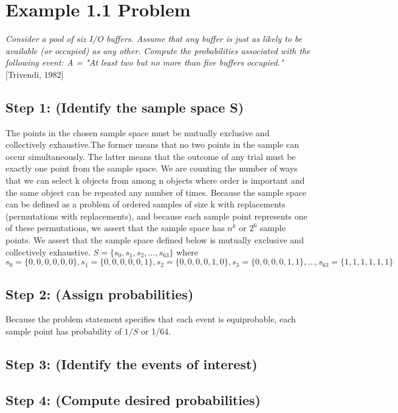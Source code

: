 \documentclass[a4paper,10pt]{article}
\title{}
\author{Mark Johnson \\
Loyola University Chicago}
\date {mjohnson4@luc.edu}
\begin{document}
\maketitle
\section{Example 1.1 Problem}
\emph{Consider a pool of siz I/O buffers. Assume that any buffer is just as likely to be available (or occupied) as 
any other. Compute the probabilities associated with the following event: \newline
A = "At least two but no more than five buffers occupied."} [Trivendi, 1982]
\subsection{Step 1: (Identify the sample space S)}
The points in the chosen sample space must be mutually exclusive and collectively exhaustive.The former means that no 
two points in the sample can occur simultaneously. The latter means that the outcome of any trial must be exactly one 
point from the sample space. We are counting the number of ways that we can select k objects from among n objects 
where order is important and the same object can be repeated any number of times. Because the sample space can be 
defined as a problem of ordered samples of size k with replacements (permutations with replacements), and because 
each sample point represents one of these permutations, we assert that the sample space has $ n^{k} $ or $ 2^{6} $ 
sample points. We assert that the sample space defined below is mutually exclusive and collectively exhaustive. 
\newline
$ S = \{s_{0}, s_{1}, s_{2},..., s_{63}\} $ where \newline
$ s_{0} = \{0,0,0,0,0,0\}, s_{1} = \{0,0,0,0,0,1\}, s_{2} = \{0,0,0,0,1,0\}, s_{3} = \{0,0,0,0,1,1\},..., s_{63} = 
\{1,1,1,1,1,1\} $
\subsection{Step 2: (Assign probabilities)}
Because the problem statement specifies that each event is equiprobable, each sample point has probability of $ 1/S $ 
or 1/64.
\subsection{Step 3: (Identify the events of interest)}

\subsection{Step 4: (Compute desired probabilities)}
\end{document}
